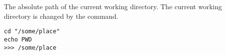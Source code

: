 %

The absolute path of the current working directory.
The current working directory is changed by the  command.

\begin{lstlisting}[style=Groovybash, label={lst:example_variable_pwd}, title={
Set and print a new current working directory.}]
cd "/some/place"
echo PWD
>>> /some/place
\end{lstlisting}

